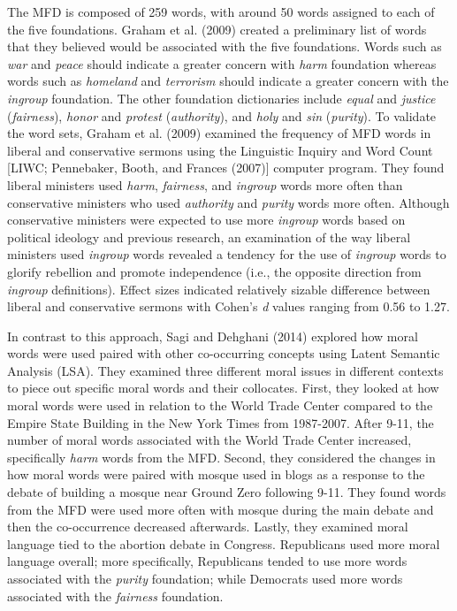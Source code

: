 \documentclass[
  man,floatsintext]{apa6}
\begin{document}
The MFD is composed of 259 words, with around 50 words assigned to each
of the five foundations. Graham et al. (2009) created a preliminary list of words
that they believed would be associated with the five foundations. Words
such as \emph{war} and \emph{peace} should indicate a greater concern with \emph{harm}
foundation whereas words such as \emph{homeland} and \emph{terrorism} should
indicate a greater concern with the \emph{ingroup} foundation. The other
foundation dictionaries include \emph{equal} and \emph{justice} (\emph{fairness}),
\emph{honor} and \emph{protest} (\emph{authority}), and \emph{holy} and \emph{sin} (\emph{purity}). To
validate the word sets, Graham et al. (2009) examined the frequency of MFD words
in liberal and conservative sermons using the Linguistic Inquiry and
Word Count {[}LIWC; Pennebaker, Booth, and Frances (2007){]} computer program. They found liberal
ministers used \emph{harm}, \emph{fairness}, and \emph{ingroup} words more often than
conservative ministers who used \emph{authority} and \emph{purity} words more
often. Although conservative ministers were expected to use more
\emph{ingroup} words based on political ideology and previous research, an
examination of the way liberal ministers used \emph{ingroup} words revealed a
tendency for the use of \emph{ingroup} words to glorify rebellion and promote
independence (i.e., the opposite direction from \emph{ingroup} definitions).
Effect sizes indicated relatively sizable difference between liberal and
conservative sermons with Cohen's \emph{d} values ranging from 0.56 to 1.27.

In contrast to this approach, Sagi and Dehghani (2014) explored how moral words were
used paired with other co-occurring concepts using Latent Semantic
Analysis (LSA). They examined three different moral issues in different
contexts to piece out specific moral words and their collocates. First,
they looked at how moral words were used in relation to the World Trade
Center compared to the Empire State Building in the New York Times from
1987-2007. After 9-11, the number of moral words associated with the
World Trade Center increased, specifically \emph{harm} words from the MFD.
Second, they considered the changes in how moral words were paired with
mosque used in blogs as a response to the debate of building a mosque
near Ground Zero following 9-11. They found words from the MFD were used
more often with mosque during the main debate and then the co-occurrence
decreased afterwards. Lastly, they examined moral language tied to the
abortion debate in Congress. Republicans used more moral language
overall; more specifically, Republicans tended to use more words
associated with the \emph{purity} foundation; while Democrats used more words
associated with the \emph{fairness} foundation.
\end{document}
